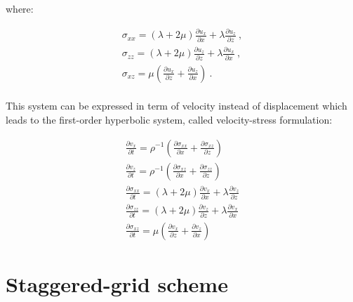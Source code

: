 \documentclass{gnulike}
\begin{document}
\noindent where:

\begin{eqnarray}
  \label{eq:displacement-stress-2}
  \sigma_{xx} = (\lambda+2\mu)\frac{\partial u_{x}}{\partial x} + \lambda \frac{\partial u_{z}}{\partial z}\ , \nonumber \\
  \sigma_{zz}= (\lambda+2\mu)\frac{\partial u_{z}}{\partial z} + \lambda \frac{\partial u_{x}}{\partial x}\ , \\
  \sigma_{xz} = \mu \left( \frac{\partial u_{x}}{\partial z} + \frac{\partial u_{z}}{\partial x } \right)\ . \nonumber
\end{eqnarray}\\

\noindent This system can be expressed in term of velocity instead of displacement which leads to the first-order hyperbolic system, called velocity-stress formulation:

\begin{eqnarray}
  \label{eq:velocity-stress}
  \frac{\partial v_{x}}{\partial t} = \rho^{{\scriptscriptstyle-1}} \left( \frac{\partial \sigma_{xx}}{\partial x} + \frac{\partial \sigma_{xz}}{\partial z} \right) \nonumber \\
  \frac{\partial v_{z}}{\partial t} = \rho^{{\scriptscriptstyle -1}} \left( \frac{\partial \sigma_{xz}}{\partial x} + \frac{\partial \sigma_{zz}}{\partial z} \right) \nonumber \\
  \frac{\partial \sigma_{xx}}{\partial t} = (\lambda+2\mu)\frac{\partial v_{x}}{\partial x} + \lambda \frac{\partial v_{z}}{\partial z} \\
  \frac{\partial \sigma_{zz}}{\partial t} = (\lambda+2\mu)\frac{\partial v_{z}}{\partial z} + \lambda \frac{\partial v_{x}}{\partial x} \nonumber \\
  \frac{\partial \sigma_{xz}}{\partial t} = \mu \left( \frac{\partial v_{x}}{\partial z} + \frac{\partial v_{z}}{\partial x } \right) \nonumber
\end{eqnarray}

\section{Staggered-grid scheme}

\cite{virieux1986psv,levander1988fourth,bohlen2006accuracy}
\end{document}
